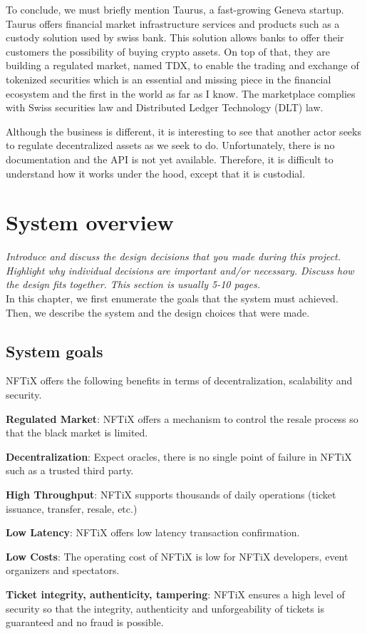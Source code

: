 \documentclass[a4paper,11pt,oneside]{report}
\begin{document}
To conclude, we must briefly mention Taurus, a fast-growing Geneva startup. Taurus offers financial market infrastructure services and products such as a custody solution used by swiss bank. This solution allows banks to offer their customers the possibility of buying crypto assets. On top of that, they are building a regulated market, named TDX, to enable the trading and exchange of tokenized securities which is an essential and missing piece in the financial ecosystem and the first in the world as far as I know. The marketplace complies with Swiss securities law and Distributed Ledger Technology (DLT) law.

Although the business is different, it is interesting to see that another actor seeks to regulate decentralized assets as we seek to do. Unfortunately, there is no documentation and the API is not yet available. Therefore, it is difficult to understand how it works under the hood, except that it is custodial.

\chapter{System overview}

\textit{Introduce and discuss the design decisions that you made during this project.
Highlight why individual decisions are important and/or necessary. Discuss
how the design fits together.
This section is usually 5-10 pages.} \\

In this chapter, we first enumerate the goals that the system must achieved. Then, we describe the system and the design choices that were made. 

\section{System goals}

NFTiX offers the following benefits in terms of decentralization, scalability and security.

\begin{description}
  \item \textbf{Regulated Market}: NFTiX offers a mechanism to control the resale process so that the black market is limited.
  \item \textbf{Decentralization}: Expect oracles, there is no single point of failure in NFTiX such as a trusted third party.
  \item \textbf{High Throughput}: NFTiX supports thousands of daily operations (ticket issuance, transfer, resale, etc.)
  \item \textbf{Low Latency}: NFTiX offers low latency transaction confirmation.
  \item \textbf{Low Costs}: The operating cost of NFTiX is low for NFTiX developers, event organizers and spectators.
  \item \textbf{Ticket integrity, authenticity, tampering}: NFTiX ensures a high level of security so that the integrity, authenticity and unforgeability of tickets is guaranteed and no fraud is possible.
\end{description}
\end{document}
